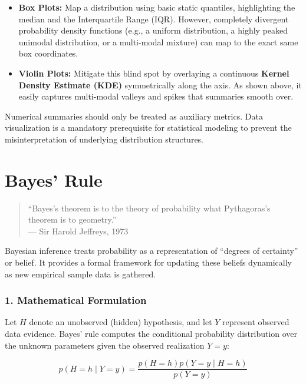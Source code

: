\documentclass{article}
\begin{document}
\begin{itemize}
    \item \textbf{Box Plots:} Map a distribution using basic static quantiles, highlighting the median and the Interquartile Range ($\text{IQR}$). However, completely divergent probability density functions (e.g., a uniform distribution, a highly peaked unimodal distribution, or a multi-modal mixture) can map to the exact same box coordinates.
    \item \textbf{Violin Plots:} Mitigate this blind spot by overlaying a continuous \textbf{Kernel Density Estimate (KDE)} symmetrically along the axis. As shown above, it easily captures multi-modal valleys and spikes that summaries smooth over.
\end{itemize}

\begin{tcolorbox}[colback=red!5!white, colframe=red!75!black, title=Methodological Takeaway]
Numerical summaries should only be treated as auxiliary metrics. Data visualization is a mandatory prerequisite for statistical modeling to prevent the misinterpretation of underlying distribution structures.
\end{tcolorbox}

\section*{Bayes' Rule}

\begin{quote}
``Bayes's theorem is to the theory of probability what Pythagoras's theorem is to geometry.'' \\
\hfill --- Sir Harold Jeffreys, 1973
\end{quote}

Bayesian inference treats probability as a representation of ``degrees of certainty'' or belief. It provides a formal framework for updating these beliefs dynamically as new empirical sample data is gathered.

\subsubsection*{1. Mathematical Formulation}
Let $H$ denote an unobserved (hidden) hypothesis, and let $Y$ represent observed data evidence. Bayes' rule computes the conditional probability distribution over the unknown parameters given the observed realization $Y = y$:

\begin{equation}
    p(H = h \mid Y = y) = \frac{p(H = h) p(Y = y \mid H = h)}{p(Y = y)}
\end{equation}
\end{document}
